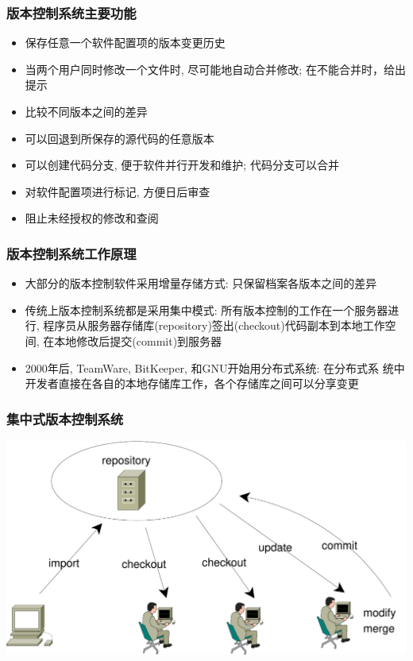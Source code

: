 \documentclass[compress]{beamer}
\begin{document}
\begin{frame}
\frametitle{版本控制系统主要功能}

\begin{itemize}
\item 保存任意一个软件配置项的版本变更历史
\item 当两个用户同时修改一个文件时, 尽可能地自动合并修改; 在不能合并时，给出提示
\item 比较不同版本之间的差异
\item 可以回退到所保存的源代码的任意版本
\item 可以创建代码分支, 便于软件并行开发和维护; 代码分支可以合并
\item 对软件配置项进行标记, 方便日后审查
\item 阻止未经授权的修改和查阅
\end{itemize}

\end{frame}

\begin{frame}
\frametitle{版本控制系统工作原理}
\begin{itemize}
\item 大部分的版本控制软件采用增量存储方式: 只保留档案各版本之间的差异
\item 传统上版本控制系统都是采用集中模式: 所有版本控制的工作在一个服务器进
行, 程序员从服务器存储库(repository)签出(checkout)代码副本到本地工作空间, 在本地修改后提交(commit)到服务器
\item 2000年后, TeamWare, BitKeeper, 和GNU开始用分布式系统: 在分布式系
统中开发者直接在各自的本地存储库工作，各个存储库之间可以分享变更
\end{itemize}

\end{frame}

\begin{frame}
\frametitle{集中式版本控制系统}
\includegraphics[width=\hsize]{centralized.pdf}

\end{frame}
\end{document}
